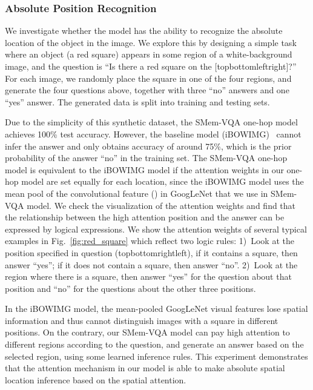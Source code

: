 \vspace{-0.1in}
\subsubsection{Absolute Position Recognition}\label{sec:absolute}
We investigate whether the model has the ability to recognize the absolute location of the object in the image. We explore this by designing a simple task where an object (a red square) appears in some region of a white-background image, and the question is ``Is there a red square on the [topbottomleftright]?'' For each image, we randomly place the square in one of the four regions, and generate the four questions above, together with three ``no'' answers and one ``yes'' answer. The generated data is split into training and testing sets. 

Due to the simplicity of this synthetic dataset, the SMem-VQA one-hop model achieves 100\% test accuracy. However, the baseline model (iBOWIMG)~\cite{zhou2015simple} cannot infer the answer and only obtains accuracy of around 75\%, which is the prior probability of the answer ``no'' in the training set. The SMem-VQA one-hop model is equivalent to the iBOWIMG model if the attention weights in our one-hop model are set equally for each location, since the iBOWIMG model uses the mean pool of the convolutional feature () in GoogLeNet that we use in SMem-VQA model. 
We check the visualization of the attention weights and find that the relationship between the high attention position and the answer can be expressed by logical expressions.
We show the attention weights of several typical examples in Fig.~\ref{fig:red_square} which reflect two logic rules:
1)~Look at the position specified in question (topbottomrightleft), if it contains a square, then answer ``yes''; if it does not contain a square, then answer ``no''.
2)~Look at the region where there is a square, then answer ``yes'' for the question about that position and ``no'' for the questions about the other three positions.

In the iBOWIMG model, the mean-pooled GoogLeNet visual features lose spatial information and thus cannot distinguish images with a square in different positions. On the contrary, our SMem-VQA model can pay high attention to different regions according to the question, and generate an answer based on the selected region, using some learned inference rules.
This experiment demonstrates that the attention mechanism in our model is able to make absolute spatial location inference based on the spatial attention. 



